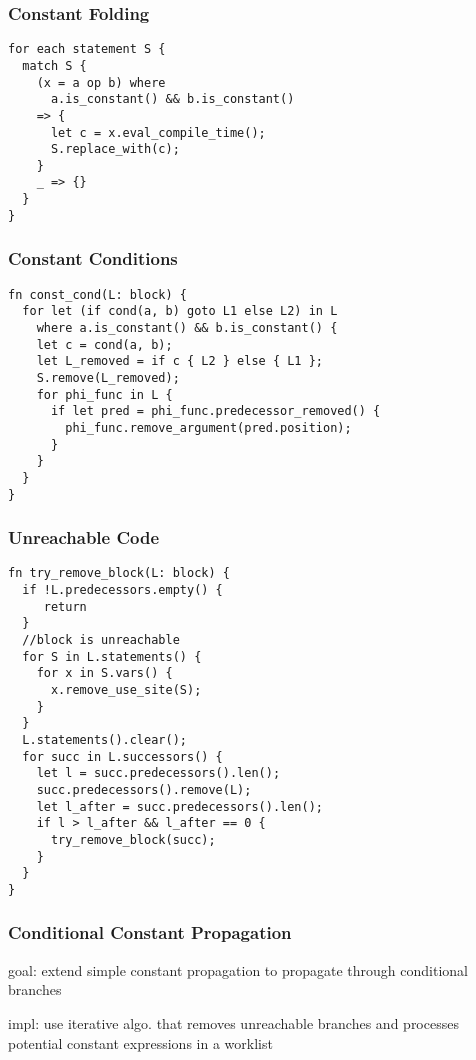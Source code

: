 \documentclass[8pt]{extarticle}
\begin{document}
\begin{multicols*}{2}
  \subsubsection{Constant Folding}

\begin{verbatim}
for each statement S {
  match S {
    (x = a op b) where
      a.is_constant() && b.is_constant()
    => {
      let c = x.eval_compile_time();
      S.replace_with(c);
    }
    _ => {}
  }
}
\end{verbatim}
  
  \subsubsection{Constant Conditions}

\begin{verbatim}
fn const_cond(L: block) {
  for let (if cond(a, b) goto L1 else L2) in L
    where a.is_constant() && b.is_constant() {
    let c = cond(a, b);
    let L_removed = if c { L2 } else { L1 };
    S.remove(L_removed);
    for phi_func in L {
      if let pred = phi_func.predecessor_removed() {
        phi_func.remove_argument(pred.position);
      }
    }
  }
}
\end{verbatim}

  \subsubsection{Unreachable Code}

\begin{verbatim}
fn try_remove_block(L: block) {
  if !L.predecessors.empty() {
     return
  }
  //block is unreachable
  for S in L.statements() {
    for x in S.vars() {
      x.remove_use_site(S);
    }
  }
  L.statements().clear();
  for succ in L.successors() {
    let l = succ.predecessors().len();
    succ.predecessors().remove(L);
    let l_after = succ.predecessors().len();
    if l > l_after && l_after == 0 {
      try_remove_block(succ);
    }
  }
}
\end{verbatim}

  \subsubsection{Conditional Constant Propagation\cite{appelbook}}

  goal: extend simple constant propagation to propagate through conditional branches

  impl: use iterative algo. that removes unreachable branches and processes potential constant expressions in a worklist


\end{multicols*}
\end{document}

